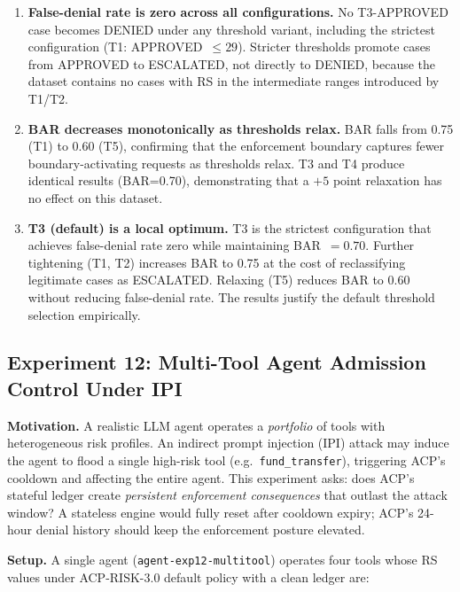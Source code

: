 \documentclass[11pt]{article}
\theoremstyle{definition}
\begin{document}
\begin{enumerate}[noitemsep]
  \item \textbf{False-denial rate is zero across all configurations.}
        No T3-APPROVED case becomes DENIED under any threshold variant,
        including the strictest configuration (T1: APPROVED~$\leq 29$).
        Stricter thresholds promote cases from APPROVED to ESCALATED,
        not directly to DENIED, because the dataset contains no cases with
        RS in the intermediate ranges introduced by T1/T2.

  \item \textbf{BAR decreases monotonically as thresholds relax.}
        BAR falls from 0.75 (T1) to 0.60 (T5), confirming that the
        enforcement boundary captures fewer boundary-activating requests
        as thresholds relax.
        T3 and T4 produce identical results (BAR=0.70), demonstrating
        that a $+5$ point relaxation has no effect on this dataset.

  \item \textbf{T3 (default) is a local optimum.}
        T3 is the strictest configuration that achieves false-denial rate
        zero while maintaining BAR~$=0.70$.
        Further tightening (T1, T2) increases BAR to 0.75 at the cost of
        reclassifying legitimate cases as ESCALATED.
        Relaxing (T5) reduces BAR to 0.60 without reducing false-denial rate.
        The results justify the default threshold selection empirically.
\end{enumerate}

\subsection{Experiment 12: Multi-Tool Agent Admission Control Under IPI}
\label{sec:exp12}

\textbf{Motivation.}
A realistic LLM agent operates a \emph{portfolio} of tools with heterogeneous
risk profiles.
An indirect prompt injection (IPI) attack may induce the agent to flood a
single high-risk tool (e.g.\ \texttt{fund\_transfer}),
triggering ACP's cooldown and affecting the entire agent.
This experiment asks: does ACP's stateful ledger create
\emph{persistent enforcement consequences} that outlast the attack window?
A stateless engine would fully reset after cooldown expiry;
ACP's 24-hour denial history should keep the enforcement posture elevated.

\textbf{Setup.}
A single agent (\texttt{agent-exp12-multitool}) operates four tools whose
RS values under ACP-RISK-3.0 default policy with a clean ledger are:
\end{document}
